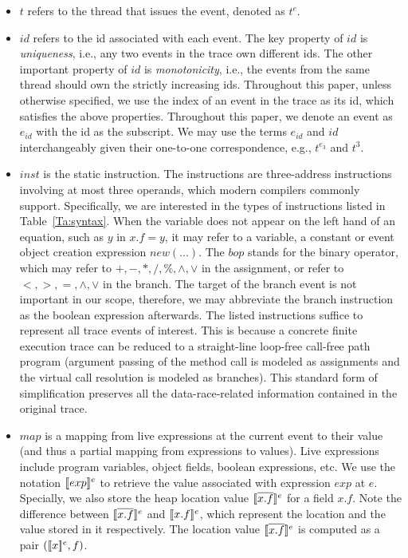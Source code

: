 \begin{itemize}
\item $t$ refers to the thread that issues the event, denoted as $t^e$.
\item  $id$ refers to the id associated with each event. The key property of  $id$ is {\em uniqueness}, i.e., any two events in the trace own different ids. The other important property of $id$ is {\em monotonicity}, i.e.,  the events from the same thread should own the strictly increasing ids. Throughout this paper, unless otherwise specified, we use  the index of an event in the trace as its id, which satisfies the above properties. Throughout this paper,  we denote an event as $e_{id}$ with the id as the subscript. We may use the terms $e_{id}$ and $id$ interchangeably given their one-to-one correspondence, e.g., $t^{e_3}$ and $t^3$. 
\item $inst$ is the static instruction. The instructions are three-address instructions involving at most three operands, which modern compilers commonly support.  Specifically, we are interested in the types of instructions listed in Table~\ref{Ta:syntax}. When the variable does not appear on the left hand of an equation, such as $y$ in $x.f=y$, it may refer to a variable, a constant or event object creation expression $new (...)$.  The $bop$ stands for the binary operator, which may refer to $+, -, *, /, \%, \wedge, \vee$ in the assignment, or refer to $<, >, =, \wedge, \vee$ in the branch. The target of the branch event is not important in our scope, therefore, we may abbreviate the branch instruction as the boolean expression afterwards. The listed instructions suffice to represent all trace events of interest. This is because a concrete finite execution trace can be reduced to a straight-line loop-free call-free path program  (argument passing of the method call is modeled as assignments and the virtual call resolution is modeled as branches). This standard form of simplification preserves all the data-race-related information contained in the original trace. 
\item $map$ is a mapping from live expressions at the current event to their value (and thus a partial mapping from expressions to values). Live expressions include program variables, object fields, boolean expressions, etc. We use the notation $\lbrack\!\lbrack exp \rbrack\!\rbrack^e$ to retrieve the value associated with expression $exp$ at $e$.
Specially,  we also store the heap location value  $\lbrack\!\lbrack \overline{x.f} \rbrack\!\rbrack^e$ for a field $x.f$. Note the difference between $\lbrack\!\lbrack \overline{x.f} \rbrack\!\rbrack^e$ and $\lbrack\!\lbrack x.f \rbrack\!\rbrack^e$, which represent the location and the value stored in it respectively. The location value $\lbrack\!\lbrack \overline{x.f} \rbrack\!\rbrack^e$ is computed as a pair $(\lbrack\!\lbrack x \rbrack\!\rbrack^e, f)$.
\end{itemize}


